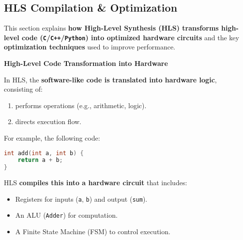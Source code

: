 \subsection{HLS Compilation \& Optimization}

This section explains \textbf{how High-Level Synthesis (HLS) transforms high-level code (\texttt{C}/\texttt{C++}/\texttt{Python}) into optimized hardware circuits} and the key \textbf{optimization techniques} used to improve performance.

\highspace
\begin{flushleft}
    \textcolor{Green3}{ \textbf{High-Level Code Transformation into Hardware}}
\end{flushleft}
In HLS, the \textbf{software-like code is translated into hardware logic}, consisting of:
\begin{enumerate}
    \item {} performs operations (e.g., arithmetic, logic).
    \item {} directs execution flow.
\end{enumerate}
For example, the following code:
\begin{lstlisting}[language=c++]
int add(int a, int b) {
    return a + b;
}    
\end{lstlisting}
HLS \textbf{compiles this into a hardware circuit} that includes:  
\begin{itemize}
    \item Registers for inputs (\texttt{a}, \texttt{b}) and output (\texttt{sum}).
    \item An ALU (\texttt{Adder}) for computation.
    \item A Finite State Machine (FSM) to control execution.
\end{itemize}

